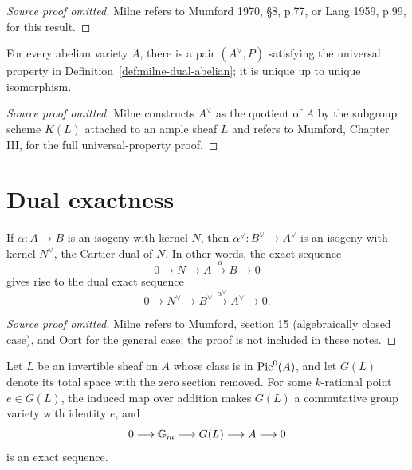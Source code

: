 \begin{proof}[Source proof omitted]
Milne refers to Mumford 1970, \S8, p.77, or Lang 1959, p.99, for this result.
\end{proof}

\begin{theorem}
\label{thm:milne-dual-existence}
For every abelian variety $A$, there is a pair $(A^\vee,P)$ satisfying the
universal property in Definition~\ref{def:milne-dual-abelian}; it is unique
up to unique isomorphism.
\end{theorem}

\begin{proof}[Source proof omitted]
Milne constructs $A^\vee$ as the quotient of $A$ by the subgroup scheme
$K(L)$ attached to an ample sheaf $L$ and refers to Mumford, Chapter III, for
the full universal-property proof.
\end{proof}

\section{Dual exactness}

\begin{theorem}
\label{thm:milne-dual-exact-sequence}

If $\alpha:A\to B$ is an isogeny with kernel $N$, then
$\alpha^\vee:B^\vee\to A^\vee$ is an isogeny with kernel $N^\vee$, the
Cartier dual of $N$.  In other words, the exact sequence
\[
0\longrightarrow N\longrightarrow A\xrightarrow{\alpha}B\longrightarrow0
\]
gives rise to the dual exact sequence
\[
0\longrightarrow N^\vee\longrightarrow B^\vee\xrightarrow{\alpha^\vee}
A^\vee\longrightarrow0.
\]
\end{theorem}

\begin{proof}[Source proof omitted]
Milne refers to Mumford, section 15 (algebraically closed case), and Oort for
the general case; the proof is not included in these notes.
\end{proof}

\begin{proposition}
\label{prop:milne-pic0-ext}

Let $L$ be an invertible sheaf on $A$ whose class is in $\operatorname{Pic}^0(A)$, and let
$G(L)$ denote its total space with the zero section removed.  For some
$k$-rational point $e\in G(L)$, the induced map over addition makes $G(L)$ a
commutative group variety with identity $e$, and
\[
0\longrightarrow\mathbb{G}_m\longrightarrow G(L)\longrightarrow A\longrightarrow0
\]
is an exact sequence.
\end{proposition}

